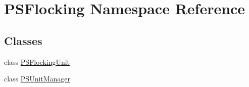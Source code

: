 \hypertarget{namespace_p_s_flocking}{}\section{P\+S\+Flocking Namespace Reference}
\label{namespace_p_s_flocking}
\subsection*{Classes}
\begin{DoxyCompactItemize}
\item 
class \hyperlink{class_p_s_flocking_1_1_p_s_flocking_unit}{P\+S\+Flocking\+Unit}
\item 
class \hyperlink{class_p_s_flocking_1_1_p_s_unit_manager}{P\+S\+Unit\+Manager}
\end{DoxyCompactItemize}

